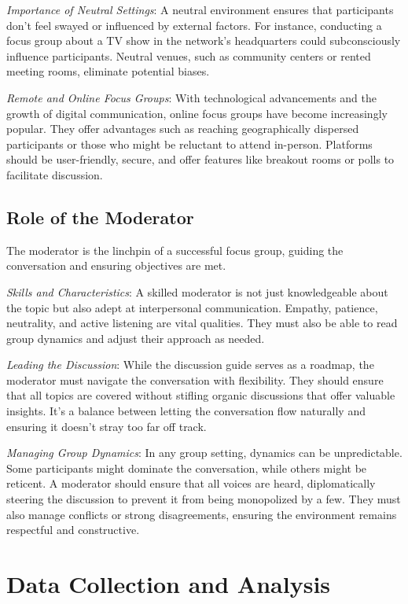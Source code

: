 \documentclass[
  b5paper]{book}
\begin{document}
\emph{Importance of Neutral Settings}: A neutral environment ensures that participants don't feel swayed or influenced by external factors. For instance, conducting a focus group about a TV show in the network's headquarters could subconsciously influence participants. Neutral venues, such as community centers or rented meeting rooms, eliminate potential biases.

\emph{Remote and Online Focus Groups}: With technological advancements and the growth of digital communication, online focus groups have become increasingly popular. They offer advantages such as reaching geographically dispersed participants or those who might be reluctant to attend in-person. Platforms should be user-friendly, secure, and offer features like breakout rooms or polls to facilitate discussion.

\hypertarget{role-of-the-moderator}{%
\subsection*{Role of the Moderator}\label{role-of-the-moderator}}

The moderator is the linchpin of a successful focus group, guiding the conversation and ensuring objectives are met.

\emph{Skills and Characteristics}: A skilled moderator is not just knowledgeable about the topic but also adept at interpersonal communication. Empathy, patience, neutrality, and active listening are vital qualities. They must also be able to read group dynamics and adjust their approach as needed.

\emph{Leading the Discussion}: While the discussion guide serves as a roadmap, the moderator must navigate the conversation with flexibility. They should ensure that all topics are covered without stifling organic discussions that offer valuable insights. It's a balance between letting the conversation flow naturally and ensuring it doesn't stray too far off track.

\emph{Managing Group Dynamics}: In any group setting, dynamics can be unpredictable. Some participants might dominate the conversation, while others might be reticent. A moderator should ensure that all voices are heard, diplomatically steering the discussion to prevent it from being monopolized by a few. They must also manage conflicts or strong disagreements, ensuring the environment remains respectful and constructive.

\hypertarget{data-collection-and-analysis}{%
\section{Data Collection and Analysis}\label{data-collection-and-analysis}}
\end{document}

